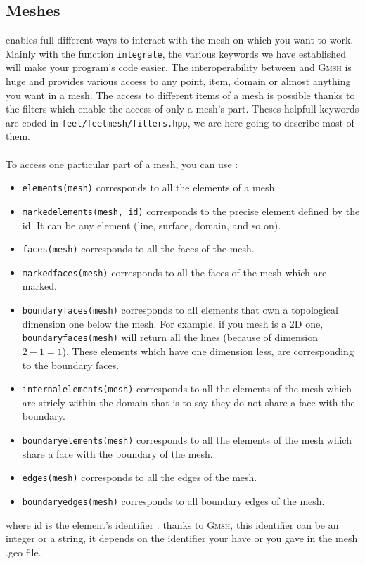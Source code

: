 \subsection{Meshes}
\label{keywords:meshes}

\feel enables full different ways to interact with the mesh on which you want to work. Mainly with the function \lstinline!integrate!, the various keywords we have established will make your program's code easier. The interoperability between \feel and \textsc{Gmsh} is huge and provides various access to any point, item, domain or almost anything you want in a mesh.
The access to different items of a mesh is possible thanks to the filters which enable the access of only a mesh's part. Theses helpfull keywords are coded in \lstinline!feel/feelmesh/filters.hpp!, we are here going to describe most of them. \\ \\ To access one particular part of a mesh, you can use :
\begin{itemize}
\item \lstinline!elements(mesh)!  corresponds to all the elements of a mesh

\item \lstinline!markedelements(mesh, id)!  corresponds to the precise element defined by the id. It can be any element (line, surface, domain, and so on).

\item \lstinline!faces(mesh)!  corresponds to all the faces of the mesh.

\item \lstinline!markedfaces(mesh)!  corresponds to all the faces of the mesh which are marked.

\item \lstinline!boundaryfaces(mesh)!  corresponds to all elements that own a topological dimension one below the mesh. For example, if you mesh is a 2D one, \lstinline!boundaryfaces(mesh)! will return all the lines (because of dimension $2-1=1$). These elements which have one dimension less, are corresponding to the boundary faces.

\item \lstinline!internalelements(mesh)!  corresponds to all the elements of the mesh which are stricly within the domain that is to say they do not share a face with the boundary.

\item \lstinline!boundaryelements(mesh)!  corresponds to all the elements of the mesh which share a face with the boundary of the mesh.

\item \lstinline!edges(mesh)!  corresponds to all the edges of the mesh.

\item \lstinline!boundaryedges(mesh)!  corresponds to all boundary edges of the mesh.

\end{itemize}
where id is the element's identifier : thanks to \textsc{Gmsh}, this identifier can be an integer or a string, it depends on the identifier your have or you gave in the mesh .geo file.



